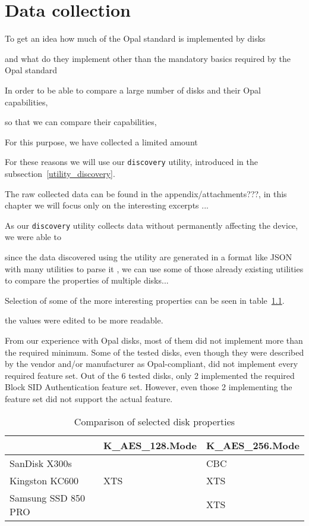 \chapter{Data collection}

To get an idea how much of the Opal standard is implemented by disks

and what do they implement other than the mandatory basics required by the Opal standard

In order to be able to compare a large number of disks and their Opal capabilities, 

so that we can compare their capabilities, 

For this purpose, we have collected a limited amount 

For these reasons we will use our \verb|discovery| utility, introduced in the subsection~\ref{utility_discovery}.

The raw collected data can be found in the appendix/attachments???, in this chapter we will focus only on the interesting excerpts ...

As our \verb|discovery| utility collects data without permanently affecting the device, we were able to 

since the data discovered using the utility are generated in a format like JSON with many utilities to parse it , we can use some of those already existing utilities to compare the properties of multiple disks...

Selection of some of the more interesting properties can be seen in table~\ref{fig:properties_table}. 

the values were edited to be more readable.



From our experience with Opal disks, most of them did not implement more than the required minimum. Some of the tested disks, even though they were described by the vendor and/or manufacturer as Opal-compliant, did not implement every required feature set. Out of the 6 tested disks, only 2 implemented the required Block SID Authentication feature set. However, even those 2 implementing the feature set did not support the actual feature.



\begin{table}[]
    \centering
    \begin{tabular}{|l|l|l|}
        \hline
                            & K\_AES\_128.Mode & K\_AES\_256.Mode \\ \hline
        SanDisk X300s       &                  & CBC              \\ \hline
        Kingston KC600      & XTS              & XTS              \\ \hline
        Samsung SSD 850 PRO &                  & XTS              \\ \hline
    \end{tabular}
    \caption{Comparison of selected disk properties}
    \label{fig:properties_table}
\end{table}

